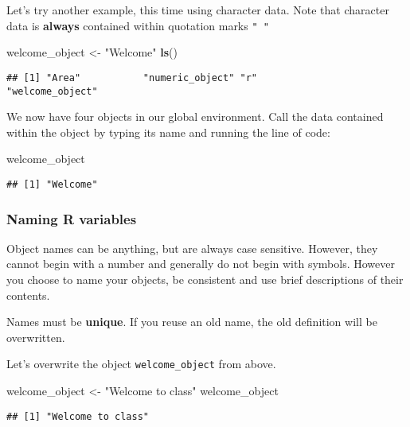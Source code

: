 \documentclass[]{article}
\newenvironment{Shaded}{\begin{snugshade}}{\end{snugshade}}
\newcommand{\KeywordTok}[1]{\textcolor[rgb]{0.13,0.29,0.53}{\textbf{#1}}}
\newcommand{\StringTok}[1]{\textcolor[rgb]{0.31,0.60,0.02}{#1}}
\newcommand{\NormalTok}[1]{#1}
\begin{document}
Let's try another example, this time using character data. Note that
character data is \textbf{always} contained within quotation marks
\texttt{"\ "}

\begin{Shaded}
\begin{Highlighting}[]
\NormalTok{welcome_object <-}\StringTok{ "Welcome"}
\KeywordTok{ls}\NormalTok{()}
\end{Highlighting}
\end{Shaded}

\begin{verbatim}
## [1] "Area"           "numeric_object" "r"              "welcome_object"
\end{verbatim}

We now have four objects in our global environment. Call the data
contained within the object by typing its name and running the line of
code:

\begin{Shaded}
\begin{Highlighting}[]
\NormalTok{welcome_object}
\end{Highlighting}
\end{Shaded}

\begin{verbatim}
## [1] "Welcome"
\end{verbatim}

\subsubsection{Naming R variables}\label{naming-r-variables}

Object names can be anything, but are always case sensitive. However,
they cannot begin with a number and generally do not begin with symbols.
However you choose to name your objects, be consistent and use brief
descriptions of their contents.

Names must be \textbf{\textbf{unique}}. If you reuse an old name, the
old definition will be overwritten.

Let's overwrite the object \texttt{welcome\_object} from above.

\begin{Shaded}
\begin{Highlighting}[]
\NormalTok{welcome_object <-}\StringTok{ "Welcome to class"} 
\NormalTok{welcome_object}
\end{Highlighting}
\end{Shaded}

\begin{verbatim}
## [1] "Welcome to class"
\end{verbatim}
\end{document}
